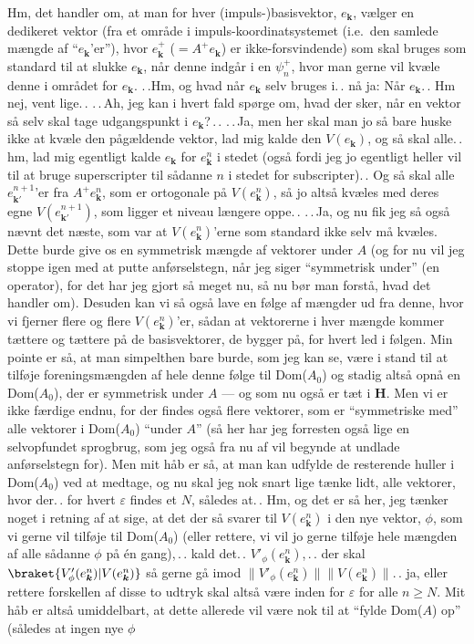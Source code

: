 \documentclass{report}
\begin{document}
Hm, det handler om, at man for hver (impuls-)basisvektor, $e_{\boldsymbol{k}}$, vælger en dedikeret vektor (fra et område i impuls-koordinatsystemet (i.e.\ den samlede mængde af ``$e_{\boldsymbol{k}}$'er''), hvor $e_{\boldsymbol{k}}^+$ ($= A^+ e_{\boldsymbol{k}}$) er ikke-forsvindende) som skal bruges som standard til at slukke $e_{\boldsymbol{k}}$, når denne indgår i en $\psi_n^+$, hvor man gerne vil kvæle denne i området for $e_{\boldsymbol{k}}$. .\,.Hm, og hvad når  $e_{\boldsymbol{k}}$ selv bruges i.\,. nå ja: Når $e_{\boldsymbol{k}}$.\,. Hm nej, vent lige.\,. .\,.\,Ah, jeg kan i hvert fald spørge om, hvad der sker, når en vektor så selv skal tage udgangspunkt i $e_{\boldsymbol{k}}$?\,.\,. .\,.\,Ja, men her skal man jo så bare huske ikke at kvæle den pågældende vektor, lad mig kalde den $V(e_{\boldsymbol{k}})$, og så skal alle.\,. hm, lad mig egentligt kalde $e_{\boldsymbol{k}}$ for $e^n_{\boldsymbol{k}}$ i stedet (også fordi jeg jo egentligt heller vil til at bruge superscripter til sådanne $n$ i stedet for subscripter).\,. Og så skal alle $e^{n+1}_{\boldsymbol{k'}}$'er fra $A^+ e^n_{\boldsymbol{k}}$, som er ortogonale på $V(e^n_{\boldsymbol{k}})$, så jo altså kvæles med deres egne $V(e^{n+1}_{\boldsymbol{k'}})$, som ligger et niveau længere oppe.\,. .\,.\,Ja, og nu fik jeg så også nævnt det næste, som var at $V(e^n_{\boldsymbol{k}})$'erne som standard ikke selv må kvæles. Dette burde give os en symmetrisk mængde af vektorer under $A$ (og for nu vil jeg stoppe igen med at putte anførselstegn, når jeg siger ``symmetrisk under'' (en operator), for det har jeg gjort så meget nu, så nu bør man forstå, hvad det handler om). Desuden kan vi så også lave en følge af mængder ud fra denne, hvor vi fjerner flere og flere $V(e^n_{\boldsymbol{k}})$'er, sådan at vektorerne i hver mængde kommer tættere og tættere på de basisvektorer, de bygger på, for hvert led i følgen. Min pointe er så, at man simpelthen bare burde, som jeg kan se, være i stand til at tilføje foreningsmængden af hele denne følge til Dom($A_0$) og stadig altså opnå en Dom($A_0$), der er symmetrisk under $A$ --- og som nu også er tæt i \textbf{H}. Men vi er ikke færdige endnu, for der findes også flere vektorer, som er ``symmetriske med'' alle vektorer i Dom($A_0$) ``under $A$'' (så her har jeg forresten også lige en selvopfundet sprogbrug, som jeg også fra nu af vil begynde at undlade anførselstegn for). Men mit håb er så, at man kan udfylde de resterende huller i Dom($A_0$) ved at medtage, og nu skal jeg nok snart lige tænke lidt, alle vektorer, hvor der.\,. for hvert $\varepsilon$ findes et $N$, således at.\,. Hm, og det er så her, jeg tænker noget i retning af at sige, at det der så svarer til $V(e^n_{\boldsymbol{k}})$ i den nye vektor, $\phi$, som vi gerne vil tilføje til Dom($A_0$) (eller rettere, vi vil jo gerne tilføje hele mængden af alle sådanne $\phi$ på én gang),\,.\,. kald det.\,. $V'_{\phi}(e^n_{\boldsymbol{k}})$,\,.\,. der skal $\braket{V'_{\phi}(e^n_{\boldsymbol{k}}) | V(e^n_{\boldsymbol{k}})}$ så gerne gå imod $\|V'_{\phi}(e^n_{\boldsymbol{k}})\| \|V(e^n_{\boldsymbol{k}})\|$.\,. ja, eller rettere forskellen af disse to udtryk skal altså være inden for $\varepsilon$ for alle $n\geq N$. Mit håb er altså umiddelbart, at dette allerede vil være nok til at ``fylde Dom($A$) op'' (således at ingen nye $\phi$ 
\end{document}
